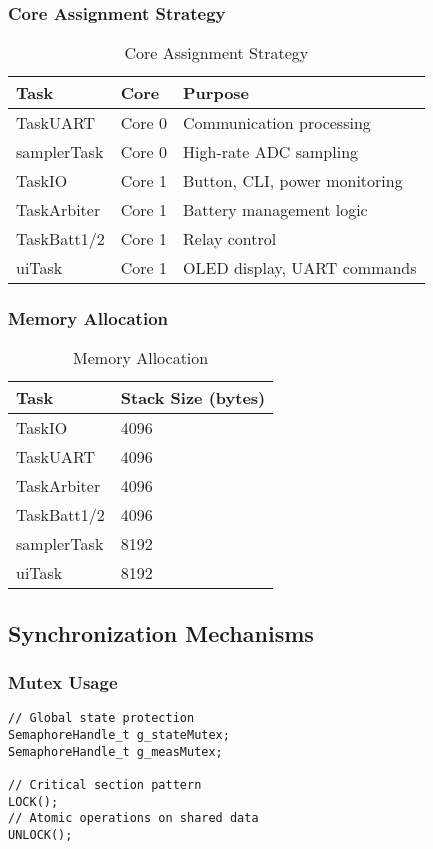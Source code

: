 \documentclass[11pt,a4paper]{article}
\begin{document}
\subsubsection{Core Assignment Strategy}
\begin{table}[H]
\centering
\begin{tabular}{@{}lll@{}}
\toprule
Task & Core & Purpose \\ \midrule
TaskUART & Core 0 & Communication processing \\
samplerTask & Core 0 & High-rate ADC sampling \\
TaskIO & Core 1 & Button, CLI, power monitoring \\
TaskArbiter & Core 1 & Battery management logic \\
TaskBatt1/2 & Core 1 & Relay control \\
uiTask & Core 1 & OLED display, UART commands \\ \bottomrule
\end{tabular}
\caption{Core Assignment Strategy}
\end{table}

\subsubsection{Memory Allocation}
\begin{table}[H]
\centering
\begin{tabular}{@{}ll@{}}
\toprule
Task & Stack Size (bytes) \\ \midrule
TaskIO & 4096 \\
TaskUART & 4096 \\
TaskArbiter & 4096 \\
TaskBatt1/2 & 4096 \\
samplerTask & 8192 \\
uiTask & 8192 \\ \bottomrule
\end{tabular}
\caption{Memory Allocation}
\end{table}

\subsection{Synchronization Mechanisms}

\subsubsection{Mutex Usage}
\begin{lstlisting}[caption=Mutex Usage]
// Global state protection
SemaphoreHandle_t g_stateMutex;
SemaphoreHandle_t g_measMutex;

// Critical section pattern
LOCK();
// Atomic operations on shared data
UNLOCK();
\end{lstlisting}
\end{document}
